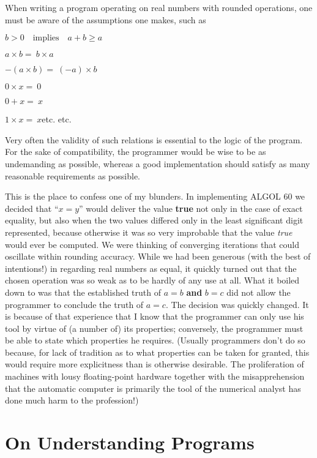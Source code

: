 When writing a program operating on real numbers with rounded operations, one must be aware of the assumptions one makes, such as
\smallskip

\tabto*{10em}$b > 0\quad \text{implies}\quad a + b \geqslant a$

\tabto*{10em}$a\times b =\ b\times a$

\tabto*{10em}$-(a \times  b) =\ (-a)\times b$

\tabto*{10em}$0\times  x =\ 0$

\tabto*{10em}$0 + x =\ x$

\tabto*{10em}$1\times x =\ x$\quad etc. etc.
\smallskip
 
Very often the validity of such relations is essential to the logic of the program. For the sake of compatibility, the programmer would be wise to be as undemanding as possible, whereas a good implementation should satisfy as many reasonable requirements as possible.

This is the place to confess one of my blunders. In implementing ALGOL 60 we decided that ``$x = y$'' would deliver the value \textbf{true} not only in the case of exact equality, but also when the two values differed only in the least significant digit represented, because otherwise it was so very improbable that the value \textit{true} would ever be computed. We were thinking of converging iterations that could oscillate within rounding accuracy. While we had been generous (with the best of intentions!) in regarding real numbers as equal, it quickly turned out that the chosen operation was so weak as to be hardly of any use at all. What it boiled down to was that the established truth of $a = b$ \textbf{and} $b = c$ did not allow the programmer to conclude the truth of $a = c$. The decision was quickly changed. It is because of that experience that I know that the programmer can only use his tool by virtue of (a number of) its properties; conversely, the programmer must be able to state which properties he requires. (Usually programmers don't do so because, for lack of tradition as to what properties can be taken for granted, this would require more explicitness than is otherwise desirable. The proliferation of machines with lousy floating-point hardware \textemdash{}  together with the misapprehension that the automatic computer is primarily the tool of the numerical analyst \textemdash{}  has done much harm to the profession!)

\section[On understanding programs]{On Understanding Programs}
\label{sec:undertanding-programs}

